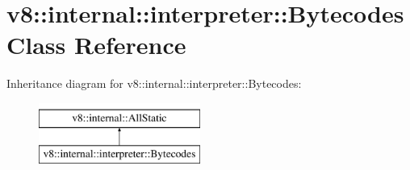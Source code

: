 \hypertarget{classv8_1_1internal_1_1interpreter_1_1Bytecodes}{}\section{v8\+:\+:internal\+:\+:interpreter\+:\+:Bytecodes Class Reference}
\label{classv8_1_1internal_1_1interpreter_1_1Bytecodes}
Inheritance diagram for v8\+:\+:internal\+:\+:interpreter\+:\+:Bytecodes\+:\begin{figure}[H]
\begin{center}
\leavevmode
\includegraphics[height=2.000000cm]{classv8_1_1internal_1_1interpreter_1_1Bytecodes}
\end{center}
\end{figure}
